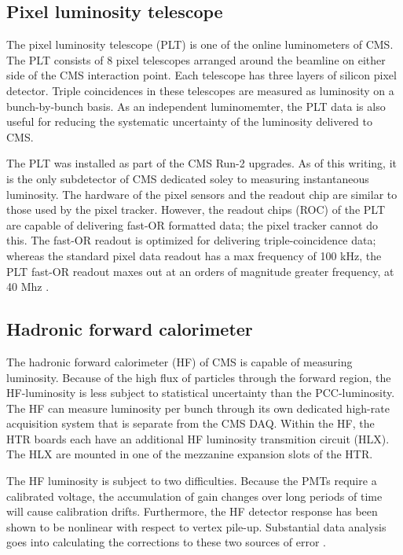 \subsection{Pixel luminosity telescope}

The pixel luminosity telescope (PLT) is one of the online luminometers of CMS. The PLT consists of 8 pixel telescopes arranged around the beamline on either side of the CMS interaction point. Each telescope has three layers of silicon pixel detector. Triple coincidences in these telescopes are measured as luminosity on a bunch-by-bunch basis. As an independent luminomemter, the PLT data is also useful for reducing the systematic uncertainty of the luminosity delivered to CMS. 

The PLT was installed as part of the CMS Run-2 upgrades. As of this writing, it is the only subdetector of CMS dedicated soley to measuring instantaneous luminosity. The hardware of the pixel sensors and the readout chip are similar to those used by the pixel tracker. However, the readout chips (ROC) of the PLT are capable of delivering fast-OR formatted data; the pixel tracker cannot do this. The fast-OR readout is optimized for delivering triple-coincidence data; whereas the standard pixel data readout has a max frequency of 100 kHz, the PLT fast-OR readout maxes out at an orders of magnitude greater frequency, at 40 Mhz \cite{Kornmayer:2016wkz}.


\subsection{Hadronic forward calorimeter}

The hadronic forward calorimeter (HF) of CMS is capable of measuring luminosity. Because of the high flux of particles through the forward region, the HF-luminosity is less subject to statistical uncertainty than the PCC-luminosity. The HF can measure luminosity per bunch through its own dedicated high-rate acquisition system that is separate from the CMS DAQ. Within the HF, the HTR boards each have an additional HF luminosity transmition circuit (HLX). The HLX are mounted in one of the mezzanine expansion slots of the HTR.

The HF luminosity is subject to two difficulties. Because the PMTs require a calibrated voltage, the accumulation of gain changes over long periods of time will cause calibration drifts. Furthermore, the HF detector response has been shown to be nonlinear with respect to vertex pile-up. Substantial data analysis goes into calculating the corrections to these two sources of error \cite{CMS:2013gfa}.  

